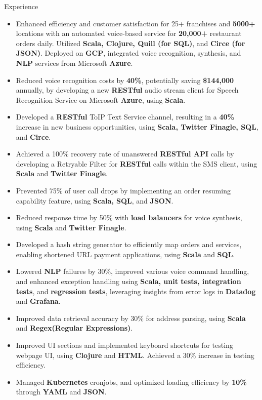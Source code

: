 \documentclass{resume} %
\begin{document}
\begin{workSection}{Experience}
      \experienceItem[
      company=Novo Labs Inc,
      location=Dallas{,} TX,
      position=Software Engineer,
      duration=Feb. 2021 – June 2023
      ]
      \vspace{-0.65em}
      \begin{itemize}
            \itemsep -6pt {}
            \item Enhanced efficiency and customer satisfaction for 25+ franchises and \textbf{5000+} locations with an automated voice-based service for \textbf{20,000+} restaurant orders daily. Utilized \textbf{Scala, Clojure, Quill (for SQL)}, and \textbf{Circe (for JSON)}. Deployed on \textbf{GCP}, integrated voice recognition, synthesis, and \textbf{NLP} services from Microsoft \textbf{Azure}.
            \item Reduced voice recognition costs by \textbf{40\%}, potentially saving \textbf{\$144,000} annually, by developing a new \textbf{RESTful} audio stream client for Speech Recognition Service on Microsoft \textbf{Azure}, using \textbf{Scala}.
            \item Developed a \textbf{RESTful} ToIP Text Service channel, resulting in a \textbf{40\%} increase in new business opportunities, using \textbf{Scala, Twitter Finagle, SQL}, and \textbf{Circe}.
            \item Achieved a 100\% recovery rate of unanswered \textbf{RESTful API} calls by developing a Retryable Filter for \textbf{RESTful} calls within the SMS client, using \textbf{Scala} and \textbf{Twitter Finagle}.
            \item Prevented 75\% of user call drops by implementing an order resuming capability feature, using \textbf{Scala, SQL}, and \textbf{JSON}.
            \item Reduced response time by 50\% with \textbf{load balancers} for voice synthesis, using \textbf{Scala} and \textbf{Twitter Finagle}.
            \item Developed a hash string generator to efficiently map orders and services, enabling shortened URL payment applications, using \textbf{Scala} and \textbf{SQL}.
            \item Lowered \textbf{NLP} failures by 30\%, improved various voice command handling, and enhanced exception handling using \textbf{Scala, unit tests, integration tests}, and \textbf{regression tests}, leveraging insights from error logs in \textbf{Datadog} and \textbf{Grafana}.
            \item Improved data retrieval accuracy by 30\% for address parsing, using \textbf{Scala} and \textbf{Regex(Regular Expressions)}.
            \item Improved UI sections and implemented keyboard shortcuts for testing webpage UI, using \textbf{Clojure} and \textbf{HTML}. Achieved a 30\% increase in testing efficiency.
            \item Managed \textbf{Kubernetes} cronjobs, and optimized loading efficiency by \textbf{10\%} through \textbf{YAML} and \textbf{JSON}.
      \end{itemize}


\end{workSection}
\end{document}
